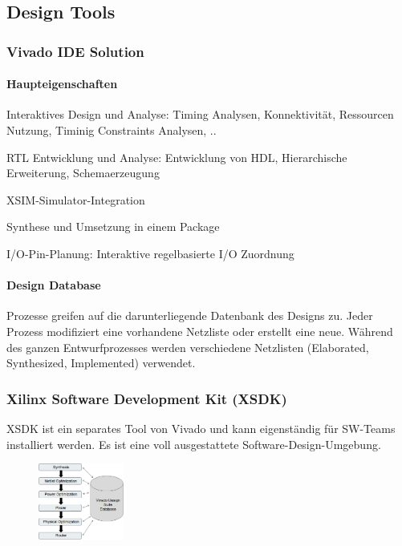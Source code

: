  \subsection{Design Tools}
 \subsubsection{Vivado IDE Solution}
 \paragraph{Haupteigenschaften}
 \begin{compactitem}
     \item Interaktives Design und Analyse: Timing Analysen, Konnektivität, Ressourcen Nutzung, Timinig Constraints Analysen, .. 
     \item RTL Entwicklung und Analyse: Entwicklung von HDL, Hierarchische Erweiterung, Schemaerzeugung
     \item XSIM-Simulator-Integration
     \item Synthese und Umsetzung in einem Package
     \item I/O-Pin-Planung: Interaktive regelbasierte I/O Zuordnung
 \end{compactitem}
 \begin{multicols}{2}
     \paragraph{Design Database}
     Prozesse greifen auf die darunterliegende Datenbank des Designs zu. Jeder Prozess modifiziert eine vorhandene Netzliste oder erstellt eine neue. Während des ganzen Entwurfprozesses werden verschiedene Netzlisten (Elaborated, Synthesized, Implemented) verwendet.
     \subsubsection{Xilinx Software Development Kit (XSDK)}
    XSDK ist ein separates Tool von Vivado und kann eigenständig für SW-Teams installiert werden. Es ist eine voll ausgestattete Software-Design-Umgebung.
     \begin{figure}[H]
     	\includegraphics[width=0.25\textwidth]{images/Design_Database.png}
     \end{figure}  
 \end{multicols}

 